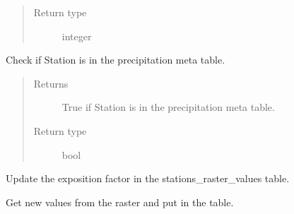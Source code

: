\documentclass[letterpaper,10pt,english]{sphinxmanual}
\begin{document}
\begin{fulllineitems}
\begin{fulllineitems}
\begin{quote}
\begin{description}
\item[{Return type}] \leavevmode
\sphinxAtStartPar
integer

\end{description}\end{quote}

\end{fulllineitems}


\begin{fulllineitems}
\label{\detokenize{weatherDB:weatherDB.station.StationTETBase.isin_meta_n}}
\sphinxAtStartPar
Check if Station is in the precipitation meta table.
\begin{quote}\begin{description}
\item[{Returns}] \leavevmode
\sphinxAtStartPar
True if Station is in the precipitation meta table.

\item[{Return type}] \leavevmode
\sphinxAtStartPar
bool

\end{description}\end{quote}

\end{fulllineitems}


\begin{fulllineitems}
\label{\detokenize{weatherDB:weatherDB.station.StationTETBase.update_exp_fact}}
\sphinxAtStartPar
Update the exposition factor in the stations\_raster\_values table.

\sphinxAtStartPar
Get new values from the raster and put in the table.

\end{fulllineitems}


\end{fulllineitems}

\end{document}
